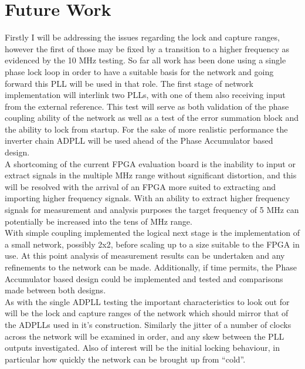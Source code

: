 \documentclass[11pt,english,british]{report}
\begin{document}
\chapter{Future Work}
Firstly I will be addressing the issues regarding the lock and capture ranges, however the first of those may be fixed by a transition to a higher frequency as evidenced by the 10 MHz testing. So far all work has been done using a single phase lock loop in order to have a suitable basis for the network and going forward this PLL will be used in that role. The first stage of network implementation will interlink two PLLs, with one of them also receiving input from the external reference. This test will serve as both validation of the phase coupling ability of the network as well as a test of the error summation block and the ability to lock from startup. For the sake of more realistic performance the inverter chain ADPLL will be used ahead of the Phase Accumulator based design.\\
A shortcoming of the current FPGA evaluation board is the inability to input or extract signals in the multiple MHz range without significant distortion, and this will be resolved with the arrival of an FPGA more suited to extracting and importing higher frequency signals. With an ability to extract higher frequency signals for measurement and analysis purposes the target frequency of 5 MHz can potentially be increased into the tens of MHz range.\\
With simple coupling implemented the logical next stage is the implementation of a small network, possibly 2x2, before scaling up to a size suitable to the FPGA in use. At this point analysis of measurement results can be undertaken and any refinements to the network can be made. Additionally, if time permits, the Phase Accumulator based design could be implemented and tested and comparisons made between both designs.\\
As with the single ADPLL testing the important characteristics to look out for will be the lock and capture ranges of the network which should mirror that of the ADPLLs used in it's construction. Similarly the jitter of a number of clocks across the network will be examined in order, and any skew between the PLL outputs investigated. Also of interest will be the initial locking behaviour, in particular how quickly the network can be brought up from ``cold''.\\

\newpage
 

\end{document}
